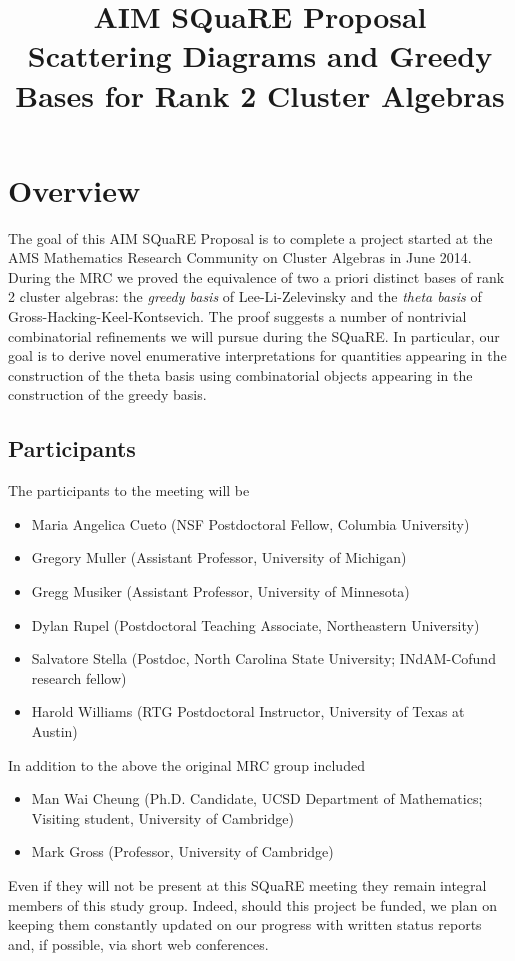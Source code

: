 \documentclass{amsart}
\title[\small{Scattering Diagrams and Greedy Bases for Rank 2 Cluster Algebras}]
  {AIM SQuaRE Proposal\\ 
  \small{Scattering Diagrams and Greedy Bases for Rank 2 Cluster Algebras}}
\begin{document}
  \maketitle
  
  \section*{Overview}
    The goal of this AIM SQuaRE Proposal is to complete a project started at the
    AMS Mathematics Research Community on Cluster Algebras in June 2014.
    During the MRC we proved the equivalence of two a priori distinct bases of
    rank 2 cluster algebras: the \emph{greedy basis} of Lee-Li-Zelevinsky and
    the \emph{theta basis} of Gross-Hacking-Keel-Kontsevich.
    The proof suggests a number of nontrivial combinatorial refinements we will
    pursue during the SQuaRE.
    In particular, our goal is to derive novel enumerative interpretations for
    quantities appearing in the construction of the theta basis using
    combinatorial objects appearing in the construction of the greedy basis.

  \subsection*{Participants}
    The participants to the meeting will be 
    \begin{itemize}
      \item Maria Angelica Cueto (NSF Postdoctoral Fellow, Columbia University)
      \item Gregory Muller (Assistant Professor, University of Michigan)
      \item Gregg Musiker (Assistant Professor, University of Minnesota)
      \item Dylan Rupel (Postdoctoral Teaching Associate, Northeastern
          University)
      \item Salvatore Stella (Postdoc, North Carolina State University;
          INdAM-Cofund research fellow)
      \item Harold Williams (RTG Postdoctoral Instructor, University of 
          Texas at Austin) 
    \end{itemize}
    In addition to the above the original MRC group included
    \begin{itemize}
      \item Man Wai Cheung (Ph.D. Candidate, UCSD Department of Mathematics;
          Visiting student, University of Cambridge)
      \item Mark Gross (Professor, University of Cambridge)
    \end{itemize}
    Even if they will not be present at this SQuaRE meeting they remain integral
    members of this study group. 
    Indeed, should this project be funded, we plan on keeping them constantly
    updated on our progress with written status reports and, if possible, via
    short web conferences.
  
\end{document}
